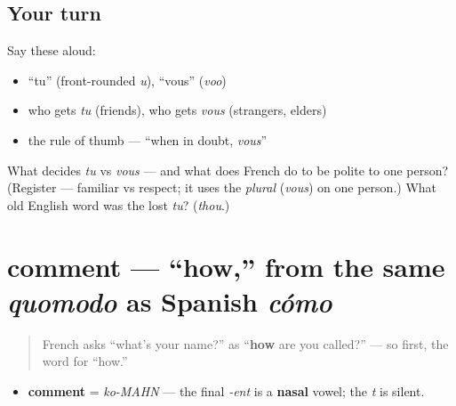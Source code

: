 \subsection*{Your turn}
Say these aloud:

\begin{itemize}
\raggedright
  \item \textquotedblleft{}tu\textquotedblright{} (front-rounded \emph{u}), \textquotedblleft{}vous\textquotedblright{} (\emph{voo})
  \item who gets \emph{tu} (friends), who gets \emph{vous} (strangers, elders)
  \item the rule of thumb — \textquotedblleft{}when in doubt, \emph{vous}\textquotedblright{}
\end{itemize}

\begin{tcolorbox}[breakable,colback=teal!4,colframe=teal!35!black,title={Before you move on}]
What decides \emph{tu} vs \emph{vous} — and what does French do to be polite to one person? (Register — familiar vs respect; it uses the \emph{plural} (\emph{vous}) on one person.) What old English word was the lost \emph{tu}? (\emph{thou}.)
\end{tcolorbox}
\section[comment]{comment — \textquotedblleft{}how,\textquotedblright{} from the same \emph{quomodo} as Spanish \emph{cómo}}

\label{lesson:FR-C02-comment}



\begin{quote}
French asks \textquotedblleft{}what's your name?\textquotedblright{} as \textquotedblleft{}\textbf{how} are you called?\textquotedblright{} — so first, the word for \textquotedblleft{}how.\textquotedblright{}
\end{quote}

\begin{sounds}
\begin{itemize}
\raggedright
  \item \textbf{comment} = \emph{ko-MAHN} — the final \emph{-ent} is a \textbf{nasal} vowel; the \emph{t} is silent.
\end{itemize}
\end{sounds}

